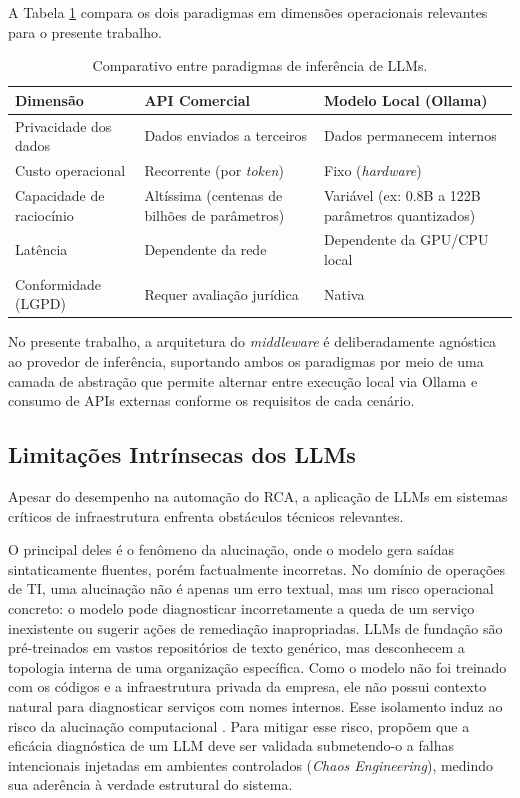 A Tabela \ref{tab:paradigmas_inferencia} compara os dois paradigmas em dimensões operacionais relevantes para o presente trabalho.

\begin{table}[htb]
    \centering
    \caption{Comparativo entre paradigmas de inferência de LLMs.}
    \label{tab:paradigmas_inferencia}
    \begin{tabular}{p{3.5cm} p{4.5cm} p{4.5cm}}
        \hline
        \textbf{Dimensão} & \textbf{API Comercial} & \textbf{Modelo Local (Ollama)} \\
        \hline
        Privacidade dos dados & Dados enviados a terceiros & Dados permanecem internos \\
        Custo operacional & Recorrente (por \textit{token}) & Fixo (\textit{hardware}) \\
        Capacidade de raciocínio & Altíssima (centenas de bilhões de parâmetros) & Variável (ex: 0.8B a 122B parâmetros quantizados) \\
        Latência & Dependente da rede & Dependente da GPU/CPU local \\
        Conformidade (LGPD) & Requer avaliação jurídica & Nativa \\
        \hline
    \end{tabular}
\end{table}

No presente trabalho, a arquitetura do \textit{middleware} é deliberadamente agnóstica ao provedor de inferência, suportando ambos os paradigmas por meio de uma camada de abstração que permite alternar entre execução local via Ollama e consumo de APIs externas conforme os requisitos de cada cenário.

\subsection{Limitações Intrínsecas dos LLMs}
\label{subsec:limitacoes_llms}

Apesar do desempenho na automação do RCA, a aplicação de LLMs em sistemas críticos de infraestrutura enfrenta obstáculos técnicos relevantes.

O principal deles é o fenômeno da alucinação, onde o modelo gera saídas sintaticamente fluentes, porém factualmente incorretas. No domínio de operações de TI, uma alucinação não é apenas um erro textual, mas um risco operacional concreto: o modelo pode diagnosticar incorretamente a queda de um serviço inexistente ou sugerir ações de remediação inapropriadas. LLMs de fundação são pré-treinados em vastos repositórios de texto genérico, mas desconhecem a topologia interna de uma organização específica. Como o modelo não foi treinado com os códigos e a infraestrutura privada da empresa, ele não possui contexto natural para diagnosticar serviços com nomes internos. Esse isolamento induz ao risco da alucinação computacional \cite{ahmed2023recommending}. Para mitigar esse risco,  propõem que a eficácia diagnóstica de um LLM deve ser validada submetendo-o a falhas intencionais injetadas em ambientes controlados (\textit{Chaos Engineering}), medindo sua aderência à verdade estrutural do sistema.

